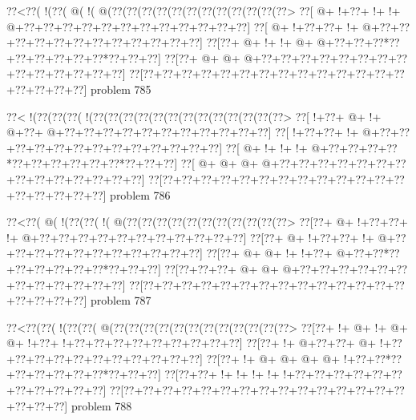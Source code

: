 \vbox{\vbox{\goo
\0??<\0??(\- !(\0??(\- @(\- !(\- @(\0??(\0??(\0??(\0??(\0??(\0??(\0??(\0??(\0??(\0??(\0??(\0??>
\0??[\- @+\- !+\0??+\- !+\- !+\- @+\0??+\0??+\0??+\0??+\0??+\0??+\0??+\0??+\0??+\0??+\0??+\0??]
\0??[\- @+\- !+\0??+\0??+\- !+\- @+\0??+\0??+\0??+\0??+\0??+\0??+\0??+\0??+\0??+\0??+\0??+\0??]
\0??[\0??+\- @+\- !+\- !+\- @+\- @+\0??+\0??+\0??*\0??+\0??+\0??+\0??+\0??+\0??*\0??+\0??+\0??]
\0??[\0??+\- @+\- @+\- @+\0??+\0??+\0??+\0??+\0??+\0??+\0??+\0??+\0??+\0??+\0??+\0??+\0??+\0??]
\0??[\0??+\0??+\0??+\0??+\0??+\0??+\0??+\0??+\0??+\0??+\0??+\0??+\0??+\0??+\0??+\0??+\0??+\0??]
}
\hfil problem 785\hfil\break
}



\vbox{\vbox{\goo
\0??<\- !(\0??(\0??(\0??(\- !(\0??(\0??(\0??(\0??(\0??(\0??(\0??(\0??(\0??(\0??(\0??(\0??(\0??>
\0??[\- !+\0??+\- @+\- !+\- @+\0??+\- @+\0??+\0??+\0??+\0??+\0??+\0??+\0??+\0??+\0??+\0??+\0??]
\0??[\- !+\0??+\0??+\- !+\- @+\0??+\0??+\0??+\0??+\0??+\0??+\0??+\0??+\0??+\0??+\0??+\0??+\0??]
\0??[\- @+\- !+\- !+\- !+\- @+\0??+\0??+\0??+\0??*\0??+\0??+\0??+\0??+\0??+\0??*\0??+\0??+\0??]
\0??[\- @+\- @+\- @+\- @+\0??+\0??+\0??+\0??+\0??+\0??+\0??+\0??+\0??+\0??+\0??+\0??+\0??+\0??]
\0??[\0??+\0??+\0??+\0??+\0??+\0??+\0??+\0??+\0??+\0??+\0??+\0??+\0??+\0??+\0??+\0??+\0??+\0??]
}
\hfil problem 786\hfil\break
}



\vbox{\vbox{\goo
\0??<\0??(\- @(\- !(\0??(\0??(\- !(\- @(\0??(\0??(\0??(\0??(\0??(\0??(\0??(\0??(\0??(\0??(\0??>
\0??[\0??+\- @+\- !+\0??+\0??+\- !+\- @+\0??+\0??+\0??+\0??+\0??+\0??+\0??+\0??+\0??+\0??+\0??]
\0??[\0??+\- @+\- !+\0??+\0??+\- !+\- @+\0??+\0??+\0??+\0??+\0??+\0??+\0??+\0??+\0??+\0??+\0??]
\0??[\0??+\- @+\- @+\- !+\- !+\0??+\- @+\0??+\0??*\0??+\0??+\0??+\0??+\0??+\0??*\0??+\0??+\0??]
\0??[\0??+\0??+\0??+\- @+\- @+\- @+\0??+\0??+\0??+\0??+\0??+\0??+\0??+\0??+\0??+\0??+\0??+\0??]
\0??[\0??+\0??+\0??+\0??+\0??+\0??+\0??+\0??+\0??+\0??+\0??+\0??+\0??+\0??+\0??+\0??+\0??+\0??]
}
\hfil problem 787\hfil\break
}



\vbox{\vbox{\goo
\0??<\0??(\0??(\- !(\0??(\0??(\- @(\0??(\0??(\0??(\0??(\0??(\0??(\0??(\0??(\0??(\0??(\0??(\0??>
\0??[\0??+\- !+\- @+\- !+\- @+\- @+\- !+\0??+\- !+\0??+\0??+\0??+\0??+\0??+\0??+\0??+\0??+\0??]
\0??[\0??+\- !+\- @+\0??+\0??+\- @+\- !+\0??+\0??+\0??+\0??+\0??+\0??+\0??+\0??+\0??+\0??+\0??]
\0??[\0??+\- !+\- @+\- @+\- @+\- @+\- !+\0??+\0??*\0??+\0??+\0??+\0??+\0??+\0??*\0??+\0??+\0??]
\0??[\0??+\0??+\- !+\- !+\- !+\- !+\- !+\0??+\0??+\0??+\0??+\0??+\0??+\0??+\0??+\0??+\0??+\0??]
\0??[\0??+\0??+\0??+\0??+\0??+\0??+\0??+\0??+\0??+\0??+\0??+\0??+\0??+\0??+\0??+\0??+\0??+\0??]
}
\hfil problem 788\hfil\break
}



